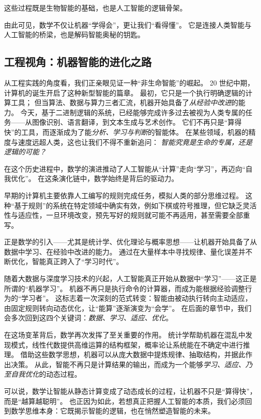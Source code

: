 这些过程既是生物智能的基础，也是人工智能的逻辑骨架。  

由此可见，数学不仅让机器“学得会”，更让我们“看得懂”。  
它是连接人类智能与人工智能的桥梁，也是解码智能奥秘的钥匙。  

\subsection{工程视角：机器智能的进化之路}

从工程实践的角度看，我们正亲眼见证一种“非生命智能”的崛起。  
20 世纪中期，计算机的诞生开启了这种新型智能的篇章。  
最初，它只是一个执行明确逻辑的计算工具；  
但当算法、数据与算力三者汇流，机器开始具备了\emph{从经验中改进}的能力。  
今天，基于二进制逻辑的系统，已经能够完成许多过去被视为人类专属的任务——从图像识别、语言翻译，到文本生成与艺术创作。  
它们不再只是“算得快”的工具，而逐渐成为了能\emph{分析、学习与判断}的智能体。  
在某些领域，机器的精度与速度远超人类，这也让我们不得不重新追问：  
\emph{智能究竟是生命的专属，还是逻辑的可能？}  

在这个历史进程中，数学的演进推动了人工智能从“计算”走向“学习”，再迈向“自我优化”。  
在这条演化链中，数学始终是背后的驱动力。  

早期的计算机主要依靠人工编写的规则完成任务，模拟人类的部分思维过程。  
这种“基于规则”的系统在特定领域中确实有效，例如下棋或符号推理，但它缺乏灵活性与适应性，一旦环境改变，预先写好的规则就可能不再适用，甚至需要全部重写。  

正是数学的引入——尤其是统计学、优化理论与概率思想——让机器开始具备了从数据中学习、在经验中改进的能力。  
通过在大量样本中寻找规律、量化误差并不断优化，智能真正跨入了“学习时代”。  

随着大数据与深度学习技术的兴起，人工智能真正开始从数据中“学习”——这正是所谓的“机器学习”。  
机器不再只是执行命令的计算器，而成为能根据经验调整行为的“学习者”。  
这标志着一次深刻的范式转变：智能由被动执行转向主动适应，由固定规则转向动态优化，让“能算”逐渐演变为“会学”。  
在后面的章节中，我们会多次回到这四个关键词：\emph{数据、学习、适应、优化}。  

在这场变革背后，数学再次发挥了至关重要的作用。  
统计学帮助机器在混乱中发现模式，线性代数提供高维运算的结构框架，概率论让系统能在不确定中进行推理。  
借助这些数学思想，机器可以从庞大数据中提炼规律、抽取结构，并据此作出决策。  
从此，智能不再只是计算结果的输出，而成为一个能够\emph{学习、适应、乃至自我优化}的动态过程。  

可以说，数学让智能从静态计算变成了动态成长的过程，让机器不只是“算得快”，而是“越算越聪明”。  
也正因为如此，若想真正把握人工智能的本质，我们必须回到数学思维本身：它既揭示智能的逻辑，也在悄然塑造智能的未来。  
